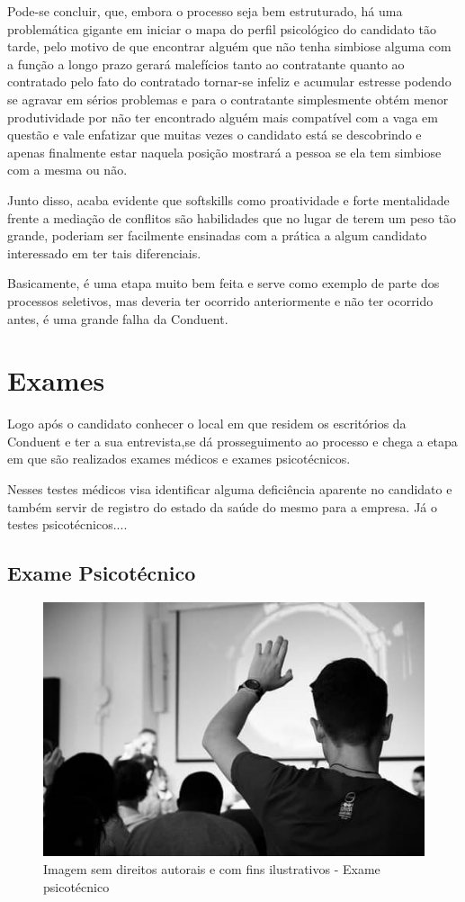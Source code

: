 \documentclass[12pt]{article}
\begin{document}
Pode-se concluir, que, embora o processo seja bem estruturado, há uma problemática gigante em iniciar o mapa do perfil psicológico do candidato tão tarde, pelo motivo de que encontrar alguém que não tenha simbiose alguma com a função a longo prazo gerará malefícios tanto ao contratante quanto ao contratado pelo fato do contratado tornar-se infeliz e acumular estresse podendo se agravar em sérios problemas e para o contratante simplesmente obtém menor produtividade por não ter encontrado alguém mais compatível com a vaga em questão e vale enfatizar que muitas vezes o candidato está se descobrindo e apenas finalmente estar naquela posição mostrará a pessoa se ela tem simbiose com a mesma ou não.

Junto disso, acaba evidente que softskills como proatividade e forte mentalidade frente a mediação de conflitos são habilidades que no lugar de terem um peso tão grande, poderiam ser facilmente ensinadas com a prática a algum candidato interessado em ter tais diferenciais.

Basicamente, é uma etapa muito bem feita e serve como exemplo de parte dos processos seletivos, mas deveria ter ocorrido anteriormente e não ter ocorrido antes, é uma grande falha da Conduent.


\section{Exames}
Logo após o candidato conhecer o local em que residem os escritórios da Conduent e ter a sua entrevista,se dá prosseguimento ao processo e chega a etapa em que são realizados exames médicos e exames psicotécnicos. 

Nesses testes médicos visa identificar alguma deficiência aparente no candidato e também servir de registro do estado da saúde do mesmo para a empresa. Já o testes psicotécnicos....

\newpage

\subsection{Exame Psicotécnico}

\begin{figure}[h]
	\centering
	\includegraphics[scale=0.5]{build/images/psychotechnicalPeople}
	\caption{Imagem sem direitos autorais e com fins ilustrativos - Exame psicotécnico}
	\label{fig:mesh1}
\end{figure}
\end{document}
